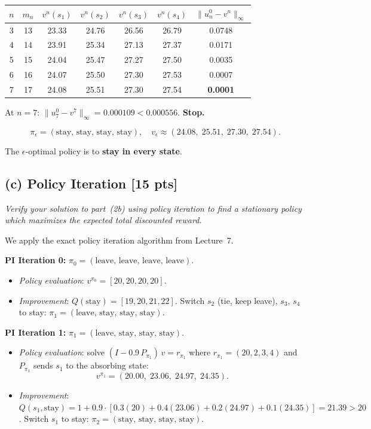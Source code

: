 \documentclass[12pt]{article}
\begin{document}
\begin{center}
\renewcommand{\arraystretch}{1.1}
\begin{tabular}{c|c|cccc|c}
\toprule
$n$ & $m_n$ & $v^n(s_1)$ & $v^n(s_2)$ & $v^n(s_3)$ & $v^n(s_4)$ & $\|u_n^0 - v^n\|_\infty$ \\
\midrule
3 & 13 & 23.33 & 24.76 & 26.56 & 26.79 & 0.0748 \\
4 & 14 & 23.91 & 25.34 & 27.13 & 27.37 & 0.0171 \\
5 & 15 & 24.04 & 25.47 & 27.27 & 27.50 & 0.0035 \\
6 & 16 & 24.07 & 25.50 & 27.30 & 27.53 & 0.0007 \\
7 & 17 & 24.08 & 25.51 & 27.30 & 27.54 & \textbf{0.0001} \\
\bottomrule
\end{tabular}
\end{center}

At $n = 7$: $\|u_7^0 - v^7\|_\infty = 0.000109 < 0.000556$. \textbf{Stop.}

\[
  \boxed{\pi_\epsilon = (\text{stay, stay, stay, stay}), \quad v_\epsilon \approx (24.08,\; 25.51,\; 27.30,\; 27.54).}
\]

The $\epsilon$-optimal policy is to \textbf{stay in every state}.

\subsection*{(c) Policy Iteration \hfill [15 pts]}

\textit{Verify your solution to part~(2b) using policy iteration to find a stationary policy which maximizes the expected total discounted reward.}

We apply the exact policy iteration algorithm from Lecture~7.

\textbf{PI Iteration 0:} $\pi_0 = (\text{leave, leave, leave, leave})$.
\begin{itemize}[nosep]
  \item \emph{Policy evaluation}: $v^{\pi_0} = [20, 20, 20, 20]$.
  \item \emph{Improvement}: $Q(\text{stay}) = [19, 20, 21, 22]$. Switch $s_2$ (tie, keep leave), $s_3$, $s_4$ to stay:
        $\pi_1 = (\text{leave, stay, stay, stay})$.
\end{itemize}

\textbf{PI Iteration 1:} $\pi_1 = (\text{leave, stay, stay, stay})$.
\begin{itemize}[nosep]
  \item \emph{Policy evaluation}: solve $(I - 0.9\, P_{\pi_1})\, v = r_{\pi_1}$ where $r_{\pi_1} = (20, 2, 3, 4)$ and $P_{\pi_1}$ sends $s_1$ to the absorbing state:
  \[
    v^{\pi_1} = (20.00,\; 23.06,\; 24.97,\; 24.35).
  \]
  \item \emph{Improvement}: $Q(s_1, \text{stay}) = 1 + 0.9 \cdot [0.3(20) + 0.4(23.06) + 0.2(24.97) + 0.1(24.35)] = 21.39 > 20$. Switch $s_1$ to stay: $\pi_2 = (\text{stay, stay, stay, stay})$.
\end{itemize}
\end{document}
